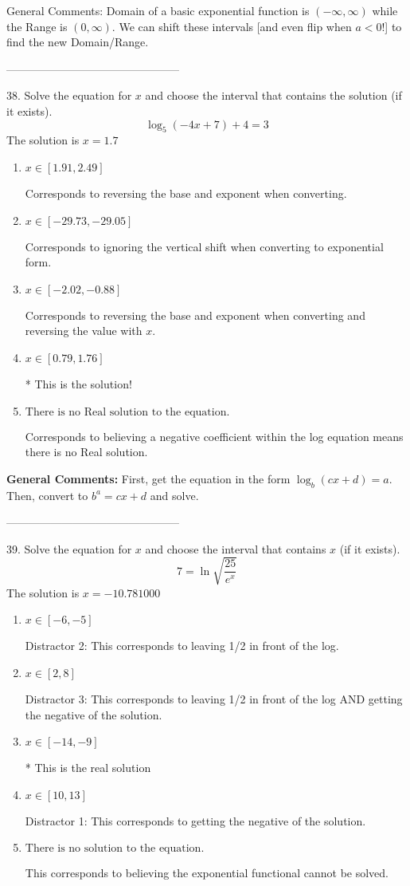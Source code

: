 \documentclass{article}[10pt]
\begin{document}
General Comments: Domain of a basic exponential function is $(-\infty, \infty)$ while the Range is $(0, \infty)$. We can shift these intervals [and even flip when $a<0$!] to find the new Domain/Range.

-----------------------------------------------

38. Solve the equation for $x$ and choose the interval that contains the solution (if it exists).
$$ \log_{5}{(-4x+7)}+4 = 3 $$ 
The solution is $ x = 1.7 $ 

\begin{enumerate}[label=\Alph*.] 
\item $ x \in [1.91, 2.49] $ 

  Corresponds to reversing the base and exponent when converting. 
\item $ x \in [-29.73, -29.05] $ 

  Corresponds to ignoring the vertical shift when converting to exponential form. 
\item $ x \in [-2.02, -0.88] $ 

  Corresponds to reversing the base and exponent when converting and reversing the value with $x$. 
\item $ x \in [0.79, 1.76] $ 

 * This is the solution! 
\item $ \text{There is no Real solution to the equation.} $ 

  Corresponds to believing a negative coefficient within the log equation means there is no Real solution. 
\end{enumerate} 
 
\textbf{General Comments:} First, get the equation in the form $\log_b{(cx+d)} = a$. Then, convert to $b^a = cx+d$ and solve.

-----------------------------------------------

39.  Solve the equation for $x$ and choose the interval that contains $x$ (if it exists).
$$  7 = \ln{\sqrt{\frac{25}{e^x}}} $$ 
The solution is $ x = -10.781000 $ 

\begin{enumerate}[label=\Alph*.] 
\item $ x \in [-6,-5] $ 

  Distractor 2: This corresponds to leaving 1/2 in front of the log. 
\item $ x \in [2,8] $ 

  Distractor 3: This corresponds to leaving 1/2 in front of the log AND getting the negative of the solution. 
\item $ x \in [-14,-9] $ 

 * This is the real solution 
\item $ x \in [10,13] $ 

  Distractor 1: This corresponds to getting the negative of the solution. 
\item $ \text{There is no solution to the equation.} $ 

 This corresponds to believing the exponential functional cannot be solved. 
\end{enumerate} 
 
\end{document}
